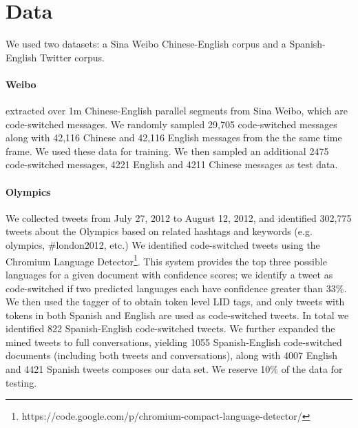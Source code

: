 \documentclass[11pt]{article}
\begin{document}
\section{Data}
We used two datasets: a Sina Weibo Chinese-English corpus
\cite{wangling:acl2013} and a Spanish-English Twitter corpus.

\paragraph{Weibo}  extracted over 1m Chinese-English parallel segments from Sina 
Weibo, which are code-switched messages. We randomly sampled 29,705 code-switched messages along with 
42,116 Chinese and 42,116 English messages from the the same time frame. We used these data for training. We 
then sampled 
an additional 2475 code-switched messages, 4221 English and 4211 Chinese messages as test data.

\paragraph{Olympics} We collected tweets from July 27, 2012 to August 12, 2012, and identified 302,775 tweets
about the Olympics based on related hashtags and keywords (e.g. olympics, \#london2012, etc.) 
We identified code-switched tweets using the Chromium Language Detector\footnote{\scriptsize{https://code.google.com/p/chromium-compact-language-detector/}}. This system provides the top three possible
languages for a given document with confidence scores; we identify a tweet as code-switched if two predicted languages
each have confidence greater than 33\%.
We then used the tagger of  to obtain token level LID tags, and only tweets with tokens in both Spanish 
and English are used as code-switched tweets. In total we identified 822 Spanish-English code-switched tweets.
We further expanded the mined tweets to full conversations, yielding 1055 Spanish-English code-switched documents (including both tweets and conversations), along with 4007 English and 4421 Spanish tweets composes our data set. We reserve 10\% of the data for testing.

\end{document}
